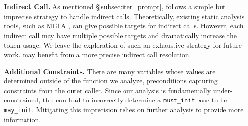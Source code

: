 \vspace{3pt}
\noindent
\textbf{Indirect Call.} 
As mentioned \S\ref{subsec:iter_prompt}, \work follows a simple but imprecise strategy to handle indirect calls. 
Theoretically, existing static analysis tools, such as MLTA \cite{lu_where_2019}, can give possible targets for indirect calls. However, 
each indirect call may have multiple
possible targets and  dramatically increase the token usage. 
We leave the exploration of such an exhaustive strategy for future work.
 \work may benefit from a more precise indirect call resolution.







\vspace{3pt}
\noindent
\textbf{Additional Constraints.} There are many variables whose values are determined outside of the function we analyze, \eg preconditions capturing constraints from the outer caller. Since our analysis is fundamentally under-constrained, this can lead \work to incorrectly determine a \texttt{must\_init} case to be \texttt{may\_init}. 
Mitigating this imprecision relies on further analysis to provide more information. 


